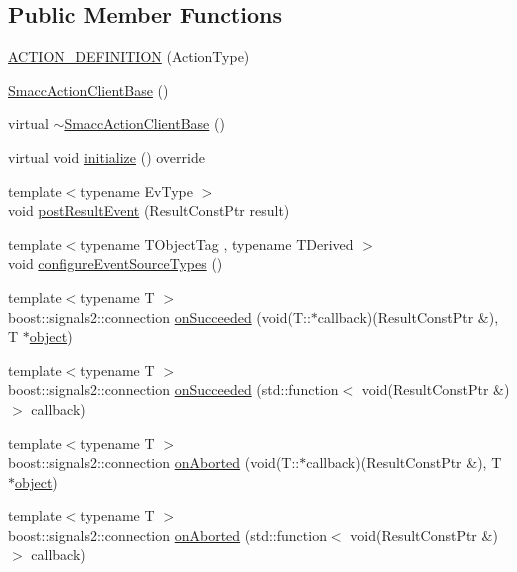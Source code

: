 \subsection*{Public Member Functions}
\begin{DoxyCompactItemize}
\item 
\hyperlink{classsmacc_1_1SmaccActionClientBase_aee053cafcc5c2e56c3c60a7de16be31a}{A\+C\+T\+I\+O\+N\+\_\+\+D\+E\+F\+I\+N\+I\+T\+I\+ON} (Action\+Type)
\item 
\hyperlink{classsmacc_1_1SmaccActionClientBase_a55625fdfd8344a88919aa6fa935b66fe}{Smacc\+Action\+Client\+Base} ()
\item 
virtual \hyperlink{classsmacc_1_1SmaccActionClientBase_a36e490ea3174b379fa0d809f60cf02e1}{$\sim$\+Smacc\+Action\+Client\+Base} ()
\item 
virtual void \hyperlink{classsmacc_1_1SmaccActionClientBase_a0224d7482b50a706f99bd280495ef1af}{initialize} () override
\item 
{\footnotesize template$<$typename Ev\+Type $>$ }\\void \hyperlink{classsmacc_1_1SmaccActionClientBase_ac04bb114099687d213d40a885d11b259}{post\+Result\+Event} (Result\+Const\+Ptr result)
\item 
{\footnotesize template$<$typename T\+Object\+Tag , typename T\+Derived $>$ }\\void \hyperlink{classsmacc_1_1SmaccActionClientBase_a2b73288ec8aeb2622164d2f814654a97}{configure\+Event\+Source\+Types} ()
\item 
{\footnotesize template$<$typename T $>$ }\\boost\+::signals2\+::connection \hyperlink{classsmacc_1_1SmaccActionClientBase_ae84ce50f0bdd42c5d32a631b4e9b8b6a}{on\+Succeeded} (void(T\+::$\ast$callback)(Result\+Const\+Ptr \&), T $\ast$\hyperlink{classobject}{object})
\item 
{\footnotesize template$<$typename T $>$ }\\boost\+::signals2\+::connection \hyperlink{classsmacc_1_1SmaccActionClientBase_a55f2d50bf0cebd335a281ce83038dbe5}{on\+Succeeded} (std\+::function$<$ void(Result\+Const\+Ptr \&)$>$ callback)
\item 
{\footnotesize template$<$typename T $>$ }\\boost\+::signals2\+::connection \hyperlink{classsmacc_1_1SmaccActionClientBase_a44132eadae8bec5188cf6952dabb23fa}{on\+Aborted} (void(T\+::$\ast$callback)(Result\+Const\+Ptr \&), T $\ast$\hyperlink{classobject}{object})
\item 
{\footnotesize template$<$typename T $>$ }\\boost\+::signals2\+::connection \hyperlink{classsmacc_1_1SmaccActionClientBase_a462db32eaf897ba7bb0dbb38fe14d57f}{on\+Aborted} (std\+::function$<$ void(Result\+Const\+Ptr \&)$>$ callback)

\end{DoxyCompactItemize}
